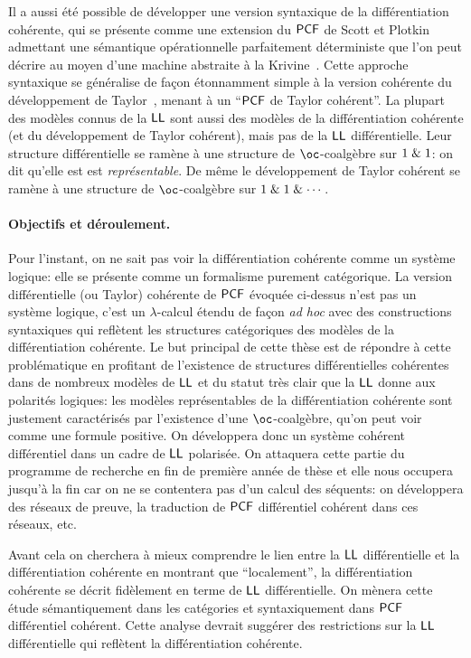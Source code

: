 \documentclass[a4]{article}
\begin{document}
Il a aussi été possible de développer une version syntaxique de la
diffé\-ren\-tia\-tion cohérente, qui se présente comme une extension du
$\mathsf{PCF}$ de Scott et Plotkin admettant une sémantique
opérationnelle parfaitement déterministe que l'on peut décrire au
moyen d'une machine abstraite à la Krivine~\cite{Ehrhard23b}.
%
Cette approche syntaxique se généralise de façon étonnamment simple à
la version cohérente du développement de
Taylor~\cite{EhrhardWalch23b}, menant à un ``$\mathsf{PCF}$ de Taylor
cohérent''.
%
La plupart des modèles connus de la $\hbox{\textsf{LL}}$ sont aussi des modèles de la
différentiation cohérente (et du développement de Taylor cohérent),
mais pas de la $\hbox{\textsf{LL}}$ différentielle.
%
Leur structure différentielle se ramène à une structure de
$\oc$-coalgèbre sur ${1}\mathrel{\&}{1}$: on dit qu'elle est
est \emph{représentable}.
%
De même le développement de Taylor cohérent se ramène à une structure
de $\oc$-coalgèbre sur $1\mathrel{\&}1\mathrel{\&}\cdots$.

\paragraph*{Objectifs et déroulement.}
Pour l'instant, on ne sait pas voir la différentiation cohérente comme
un système logique: elle se présente comme un formalisme purement
catégorique.
%
La version différentielle (ou Taylor) cohérente de $\mathsf{PCF}$ évoquée
ci-dessus n'est pas un système logique, c'est un $\lambda$-calcul
étendu de façon \emph{ad hoc} avec des constructions syntaxiques qui
reflètent les structures catégoriques des modèles de la
différentiation cohérente.
%
Le but principal de cette thèse est de répondre à cette problématique
en profitant de l'existence de structures différentielles cohérentes
dans de nombreux modèles de $\hbox{\textsf{LL}}$ et du statut très clair que la $\hbox{\textsf{LL}}$
donne aux polarités logiques: les modèles représentables de la
différentiation cohérente sont justement caractérisés par l'existence
d'une $\oc$-coalgèbre, qu'on peut voir comme une formule positive.
%
On développera donc un système cohérent différentiel dans un cadre de
$\hbox{\textsf{LL}}$ polarisée.
%
On attaquera cette partie du programme de recherche en fin de première
année de thèse et elle nous occupera jusqu'à la fin car on ne se
contentera pas d'un calcul des séquents: on développera des réseaux de
preuve, la traduction de $\mathsf{PCF}$ différentiel cohérent dans ces réseaux,
etc.

Avant cela on cherchera à mieux comprendre le lien entre la $\hbox{\textsf{LL}}$
différentielle et la différentiation cohérente en montrant que
``localement'', la différentiation cohérente se décrit fidèlement en
terme de $\hbox{\textsf{LL}}$ différentielle.
%
On mènera cette étude sémantiquement dans les catégories et
syntaxiquement dans $\mathsf{PCF}$ différentiel cohérent.
%
Cette analyse devrait suggérer des restrictions sur la $\hbox{\textsf{LL}}$
différentielle qui reflètent la différentiation cohérente.
\end{document}
